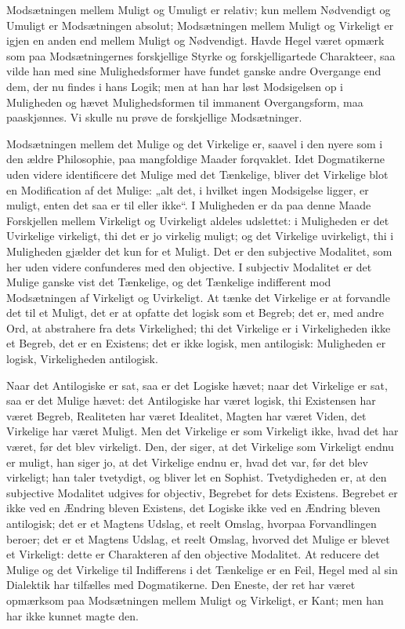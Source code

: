 \documentclass[12pt]{book}
\newcommand{\opage}[1]{\marginnote{\footnotesize\textit{[#1]}}}
\begin{document}
Modsætningen mellem Muligt og Umuligt er relativ; kun mellem Nødvendigt og Umuligt er Modsætningen absolut; Modsætningen mellem Muligt og Virkeligt er igjen en anden end mellem Muligt og Nødvendigt. Havde Hegel været opmærk%
\opage{237}som paa Modsætningernes forskjellige Styrke og forskjelligartede Charakteer, saa vilde han med sine Mulighedsformer have fundet ganske andre Overgange end dem, der nu findes i hans Logik; men at han har løst Modsigelsen op i Muligheden og hævet Mulighedsformen til immanent Overgangsform, maa paaskjønnes. Vi skulle nu prøve de forskjellige Modsætninger.

Modsætningen mellem det Mulige og det Virkelige er, saavel i den nyere som i den ældre Philosophie, paa mangfoldige Maader forqvaklet. Idet Dogmatikerne uden videre identificere det Mulige med det Tænkelige, bliver det Virkelige blot en Modification af det Mulige: „alt det, i hvilket ingen Modsigelse ligger, er muligt, enten det saa er til eller ikke“. I Muligheden er da paa denne Maade Forskjellen mellem Virkeligt og Uvirkeligt aldeles udslettet: i Muligheden er det Uvirkelige virkeligt, thi det er jo virkelig muligt; og det Virkelige uvirkeligt, thi i Muligheden gjælder det kun for et Muligt. Det er den subjective Modalitet, som her uden videre confunderes med den objective. I subjectiv Modalitet er det Mulige ganske vist det Tænkelige, og det Tænkelige indifferent mod Modsætningen af Virkeligt og Uvirkeligt. At tænke det Virkelige er at forvandle det til et Muligt, det er at opfatte det logisk som et Begreb; det er, med andre Ord, at abstrahere fra dets Virkelighed; thi det Virkelige er i Virkeligheden ikke et Begreb, det er en Existens; det er ikke logisk, men antilogisk: Muligheden er logisk, Virkeligheden antilogisk.

Naar det Antilogiske er sat, saa er det Logiske hævet; naar det Virkelige er sat, saa er det Mulige hævet: det Antilogiske har været logisk, thi Existensen har været Begreb, Realiteten har været Idealitet, Magten har været Viden, det Virkelige har været Muligt. Men det Virkelige er som Virkeligt ikke, hvad det har været, før det blev virkeligt. Den, der siger, at det Virkelige som Virkeligt endnu er muligt, han siger jo, at det Virkelige endnu er, hvad det var, før det
\opage{238}blev virkeligt; han taler tvetydigt, og bliver let en Sophist. Tvetydigheden er, at den subjective Modalitet udgives for objectiv, Begrebet for dets Existens. Begrebet er ikke ved en Ændring bleven Existens, det Logiske ikke ved en Ændring bleven antilogisk; det er et Magtens Udslag, et reelt Omslag, hvorpaa Forvandlingen beroer; det er et Magtens Udslag, et reelt Omslag, hvorved det Mulige er blevet et Virkeligt: dette er Charakteren af den objective Modalitet. At reducere det Mulige og det Virkelige til Indifferens i det Tænkelige er en Feil, Hegel med al sin Dialektik har tilfælles med Dogmatikerne. Den Eneste, der ret har været opmærksom paa Modsætningen mellem Muligt og Virkeligt, er Kant; men han har ikke kunnet magte den.
\end{document}
